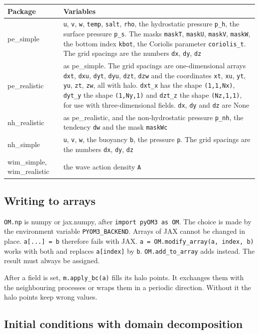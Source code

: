 \documentclass[12pt]{article}
\begin{document}
\begin{longtable}{@{}lp{10.6cm}@{}}
\hline
Package & Variables \\
\hline
\endhead
pe\_simple & \verb|u|, \verb|v|, \verb|w|, \verb|temp|, \verb|salt|, \verb|rho|, the hydrostatic pressure \verb|p_h|, the surface pressure \verb|p_s|.
  The masks \verb|maskT|, \verb|maskU|, \verb|maskV|, \verb|maskW|, the bottom index \verb|kbot|, the Coriolis parameter \verb|coriolis_t|.
  The grid spacings are the numbers \verb|dx|, \verb|dy|, \verb|dz| \\
pe\_realistic & as pe\_simple.
  The grid spacings are one-dimensional arrays \verb|dxt|, \verb|dxu|, \verb|dyt|, \verb|dyu|, \verb|dzt|, \verb|dzw| and the coordinates \verb|xt|, \verb|xu|, \verb|yt|, \verb|yu|, \verb|zt|, \verb|zw|, all with halo.
  \verb|dxt_x| has the shape \verb|(1,1,Nx)|, \verb|dyt_y| the shape \verb|(1,Ny,1)| and \verb|dzt_z| the shape \verb|(Nz,1,1)|, for use with three-dimensional fields.
  \verb|dx|, \verb|dy| and \verb|dz| are None \\
nh\_realistic & as pe\_realistic, and the non-hydrostatic pressure \verb|p_nh|, the tendency \verb|dw| and the mask \verb|maskWc| \\
nh\_simple & \verb|u|, \verb|v|, \verb|w|, the buoyancy \verb|b|, the pressure \verb|p|.
  The grid spacings are the numbers \verb|dx|, \verb|dy|, \verb|dz| \\
wim\_simple, wim\_realistic & the wave action density \verb|A| \\
\hline
\end{longtable}

\subsection*{Writing to arrays}

\verb|OM.np| is numpy or jax.numpy, after \verb|import pyOM3 as OM|.
The choice is made by the environment variable \verb|PYOM3_BACKEND|.
Arrays of JAX cannot be changed in place.
\verb|a[...] = b| therefore fails with JAX.
\verb|a = OM.modify_array(a, index, b)| works with both and replaces \verb|a[index]| by \verb|b|.
\verb|OM.add_to_array| adds instead.
The result must always be assigned.

After a field is set, \verb|m.apply_bc(a)| fills its halo points.
It exchanges them with the neighbouring processes or wraps them in a periodic direction.
Without it the halo points keep wrong values.

\subsection*{Initial conditions with domain decomposition}
\end{document}
